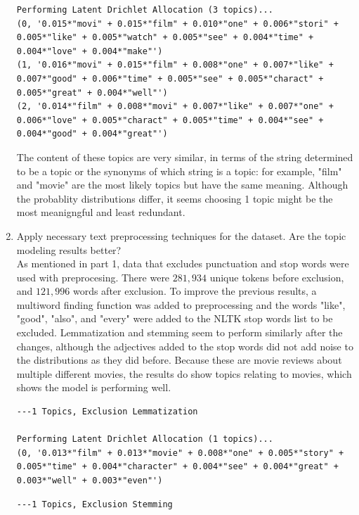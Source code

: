 \documentclass[conference]{IEEEtran}
\begin{document}
\begin{enumerate}
\begin{lstlisting}
Performing Latent Drichlet Allocation (3 topics)...
(0, '0.015*"movi" + 0.015*"film" + 0.010*"one" + 0.006*"stori" + 0.005*"like" + 0.005*"watch" + 0.005*"see" + 0.004*"time" + 0.004*"love" + 0.004*"make"')
(1, '0.016*"movi" + 0.015*"film" + 0.008*"one" + 0.007*"like" + 0.007*"good" + 0.006*"time" + 0.005*"see" + 0.005*"charact" + 0.005*"great" + 0.004*"well"')
(2, '0.014*"film" + 0.008*"movi" + 0.007*"like" + 0.007*"one" + 0.006*"love" + 0.005*"charact" + 0.005*"time" + 0.004*"see" + 0.004*"good" + 0.004*"great"')
\end{lstlisting}
The content of these topics are very similar, in terms of the string determined to be a topic or the synonyms of which string is a topic: for example, "film" and "movie" are the most likely topics but have the same meaning. Although the probablity distributions differ, it seems choosing 1 topic might be the most meanigngful and least redundant.\\
    \item Apply necessary text preprocessing techniques for the dataset. Are the topic modeling results better?\\
    As mentioned in part 1, data that excludes punctuation and stop words were used with preprocesing. There were $281,934$ unique tokens before exclusion, and $121,996$ words after exclusion. To improve the previous results, a multiword finding function was added to preprocessing and the words "like", "good", "also", and "every" were added to the NLTK stop words list to be excluded. Lemmatization and stemming seem to perform similarly after the changes, although the adjectives added to the stop words did not add noise to the distributions as they did before. Because these are movie reviews about multiple different movies, the results do show topics relating to movies, which shows the model is performing well.
\begin{lstlisting}
---1 Topics, Exclusion Lemmatization

Performing Latent Drichlet Allocation (1 topics)...
(0, '0.013*"film" + 0.013*"movie" + 0.008*"one" + 0.005*"story" + 0.005*"time" + 0.004*"character" + 0.004*"see" + 0.004*"great" + 0.003*"well" + 0.003*"even"')
\end{lstlisting}
\begin{lstlisting}
---1 Topics, Exclusion Stemming


\end{lstlisting}
\end{enumerate}
\end{document}
